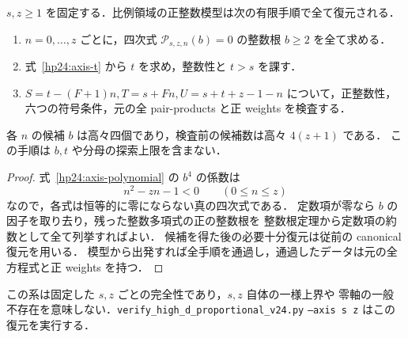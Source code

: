 \begin{corollary}[二整数を固定した零軸の完全有限復元]
\label{hp24:finite-axis}
$s,z\ge1$ を固定する．比例領域の正整数模型は次の有限手順で全て復元される．
\begin{enumerate}
\item $n=0,\ldots,z$ ごとに，四次式 $\mathcal P_{s,z,n}(b)=0$ の整数根 $b\ge2$ を全て求める．
\item 式~\eqref{hp24:axis-t} から $t$ を求め，整数性と $t>s$ を課す．
\item $S=t-(F+1)n,T=s+Fn,U=s+t+z-1-n$ について，正整数性，
六つの符号条件，元の全 pair-products と正 weights を検査する．
\end{enumerate}
各 $n$ の候補 $b$ は高々四個であり，検査前の候補数は高々 $4(z+1)$ である．
この手順は $b,t$ や分母の探索上限を含まない．
\end{corollary}

\begin{proof}
式~\eqref{hp24:axis-polynomial} の $b^4$ の係数は
\[
 n^2-zn-1<0\qquad(0\le n\le z)
\]
なので，各式は恒等的に零にならない真の四次式である．
定数項が零なら $b$ の因子を取り去り，残った整数多項式の正の整数根を
整数根定理から定数項の約数として全て列挙すればよい．
候補を得た後の必要十分復元は従前の canonical 復元を用いる．
模型から出発すれば全手順を通過し，通過したデータは元の全方程式と正 weights を持つ．
\end{proof}

この系は固定した $s,z$ ごとの完全性であり，$s,z$ 自体の一様上界や
零軸の一般不存在を意味しない．\nolinkurl{verify_high_d_proportional_v24.py} \texttt{--axis s z}
はこの復元を実行する．
